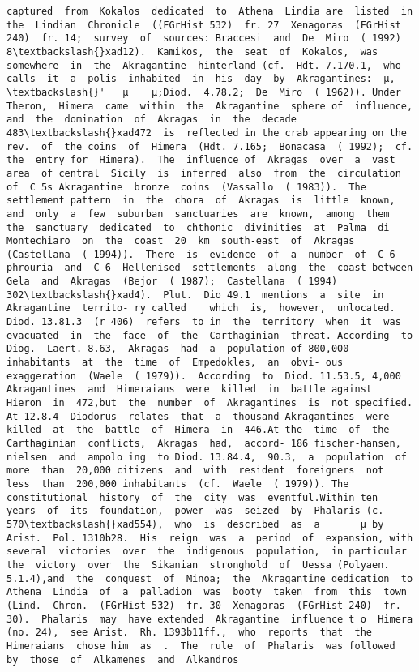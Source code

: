 \documentclass[11pt]{article}
\begin{document}
\begin{Verbatim}[commandchars=\\\{\}]
captured  from  Kokalos  dedicated  to  Athena  Lindia are  listed  in  the  Lindian  Chronicle  ((FGrHist 532)  fr. 27  Xenagoras  (FGrHist 240)  fr. 14;  survey  of  sources: Braccesi  and  De  Miro  ( 1992)  8\textbackslash{}xad12).  Kamikos,  the  seat  of  Kokalos,  was  somewhere  in  the  Akragantine  hinterland (cf.  Hdt. 7.170.1,  who  calls  it  a  polis  inhabited  in  his  day  by  Akragantines:  µ,  \textbackslash{}'   µ    µ;Diod.  4.78.2;  De  Miro  ( 1962)). Under  Theron,  Himera  came  within  the  Akragantine  sphere of  influence,  and  the  domination  of  Akragas  in  the  decade 483\textbackslash{}xad472  is  reflected in the crab appearing on the rev.  of  the coins  of  Himera  (Hdt. 7.165;  Bonacasa  ( 1992);  cf.  the  entry for  Himera).  The  influence of  Akragas  over  a  vast  area  of central  Sicily  is  inferred  also  from  the  circulation  of  C 5s Akragantine  bronze  coins  (Vassallo  ( 1983)).  The  settlement pattern  in  the  chora  of  Akragas  is  little  known,  and  only  a  few  suburban  sanctuaries  are  known,  among  them  the  sanctuary  dedicated  to  chthonic  divinities  at  Palma  di Montechiaro  on  the  coast  20  km  south-east  of  Akragas (Castellana  ( 1994)).  There  is  evidence  of  a  number  of  C 6 phrouria  and  C 6  Hellenised  settlements  along  the  coast between  Gela  and  Akragas  (Bejor  ( 1987);  Castellana  ( 1994) 302\textbackslash{}xad4).  Plut.  Dio 49.1  mentions  a  site  in  Akragantine  territo- ry called    which  is,  however,  unlocated.  Diod. 13.81.3  (r 406)  refers  to in  the  territory  when  it  was evacuated  in  the  face  of  the  Carthaginian  threat. According  to  Diog.  Laert. 8.63,  Akragas  had  a  population of 800,000  inhabitants  at  the  time  of  Empedokles,  an  obvi- ous  exaggeration  (Waele  ( 1979)).  According  to  Diod. 11.53.5, 4,000  Akragantines  and  Himeraians  were  killed  in  battle against  Hieron  in  472,but  the  number  of  Akragantines  is  not specified.  At 12.8.4  Diodorus  relates  that  a  thousand Akragantines  were  killed  at  the  battle  of  Himera  in  446.At the  time  of  the  Carthaginian  conflicts,  Akragas  had,  accord- 186 fischer-hansen,  nielsen  and  ampolo ing  to Diod. 13.84.4,  90.3,  a  population  of  more  than  20,000 citizens  and  with  resident  foreigners  not  less  than  200,000 inhabitants  (cf.  Waele  ( 1979)). The  constitutional  history  of  the  city  was  eventful.Within ten  years  of  its  foundation,  power  was  seized  by  Phalaris (c. 570\textbackslash{}xad554),  who  is  described  as  a       µ by  Arist.  Pol. 1310b28.  His  reign  was  a  period  of  expansion, with  several  victories  over  the  indigenous  population,  in particular  the  victory  over  the  Sikanian  stronghold  of  Uessa (Polyaen. 5.1.4),and  the  conquest  of  Minoa;  the  Akragantine dedication  to  Athena  Lindia  of  a  palladion  was  booty  taken  from  this  town (Lind.  Chron.  (FGrHist 532)  fr. 30  Xenagoras  (FGrHist 240)  fr. 30).  Phalaris  may  have extended  Akragantine  influence t o  Himera  (no. 24),  see Arist.  Rh. 1393b11ff.,  who  reports  that  the  Himeraians  chose him  as  .  The  rule  of  Phalaris  was followed  by  those  of  Alkamenes  and  Alkandros  
\end{Verbatim}
\end{document}
